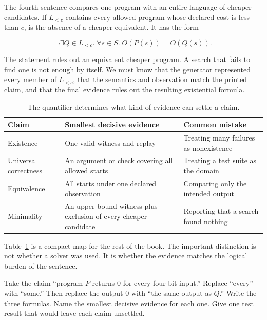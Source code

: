 The fourth sentence compares one program with an entire language of cheaper
candidates. If \(L_{<c}\) contains every allowed program whose declared cost is
less than \(c\),  is the absence of a cheaper equivalent. It
has the form

\[
  \neg\exists Q\in L_{<c}.\;
  \forall s\in S.\; O(P(s))=O(Q(s)).
\]

The statement rules out an equivalent cheaper program. A search that fails to
find one is not enough by itself. We must know that the generator represented
every member of \(L_{<c}\), that the semantics and observation match the printed
claim, and that the final evidence rules out the resulting existential
formula.

\begin{table}[htbp]
\centering
\begin{tabular}{@{}p{}p{}p{}@{}}
\toprule
Claim & Smallest decisive evidence & Common mistake \\
\midrule
Existence & One valid witness and replay & Treating many failures as nonexistence \\
Universal correctness & An argument or check covering all allowed starts & Treating a test suite as the domain \\
Equivalence & All starts under one declared observation & Comparing only the intended output \\
Minimality & An upper-bound witness plus exclusion of every cheaper candidate & Reporting that a search found nothing \\
\bottomrule
\end{tabular}
\caption{The quantifier determines what kind of evidence can settle a claim.}
\label{tab:intro-claim-shapes}
\end{table}

Table~\ref{tab:intro-claim-shapes} is a compact map for the rest of the book.
The important distinction is not whether a solver was used. It is whether the
evidence matches the logical burden of the sentence.

\begin{tryit}[title={\iconTryIt\ Change one quantifier}]
Take the claim ``program \(P\) returns 0 for every four-bit input.'' Replace
``every'' with ``some.'' Then replace the output 0 with ``the same output as
\(Q\).'' Write the three formulas. Name the smallest decisive evidence for each
one. Give one test result that would leave each claim unsettled.
\end{tryit}


